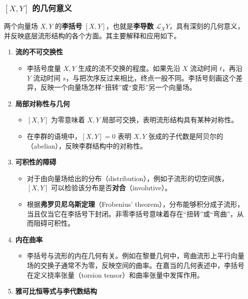 \subsubsection{\texorpdfstring{$[X,Y]$ 的几何意义}{[X,Y] 的几何意义}}
两个向量场 $X,Y$ 的\textbf{李括号} $[X,Y]$，也就是\textbf{李导数} $\mathcal L_XY$，具有深刻的几何意义，并反映底层流形结构的各个方面。其主要解释和应用如下。
\begin{enumerate}
  \item \textbf{流的不可交换性}
  \begin{itemize}
    \item 李括号度量 $X,Y$ 生成的流不交换的程度。如果先沿 $X$ 流动时间 $t$，再沿 $Y$ 流动时间 $s$，与把次序反过来相比，终点一般不同。李括号刻画这个差异，反映一个向量场怎样“扭转”或“变形”另一个向量场。
  \end{itemize}
  \item \textbf{局部对称性与几何}
  \begin{itemize}
    \item $[X,Y]$ 为零意味着 $X,Y$ 局部可交换，表明流形结构具有某种对称性。
    \item 在李群的语境中，$[X,Y]=0$ 表明 $X,Y$ 张成的子代数是阿贝尔的（abelian），反映李群结构中的对称性。
  \end{itemize}
  \item \textbf{可积性的障碍}
  \begin{itemize}
    \item 对于由向量场给出的分布（distribution），例如子流形的切空间族，$[X,Y]$ 可以检验该分布是否\textbf{对合}（involutive）。
    \item 根据\textbf{弗罗贝尼乌斯定理}（Frobenius' theorem），分布能够积分成子流形，当且仅当它在李括号下封闭。非零李括号意味着存在“扭转”或“弯曲”，从而阻碍可积性。
  \end{itemize}
  \item \textbf{内在曲率}
  \begin{itemize}
    \item 李括号与流形的内在几何有关。例如在黎曼几何中，弯曲流形上平行向量场的交换子通常不为零，反映空间的曲率。在嘉当的几何表述中，李括号在定义挠率张量（torsion tensor）和曲率张量中发挥作用。
  \end{itemize}
  \item \textbf{雅可比恒等式与李代数结构}

\end{enumerate}
